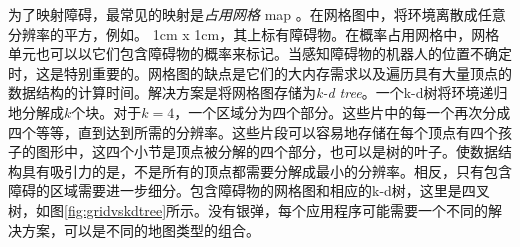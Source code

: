 
为了映射障碍，最常见的映射是\emph {占用网格} map 。在网格图中，将环境离散成任意分辨率的平方，例如。 1cm x 1cm，其上标有障碍物。在概率占用网格中，网格单元也可以以它们包含障碍物的概率来标记。当感知障碍物的机器人的位置不确定时，这是特别重要的。网格图的缺点是它们的大内存需求以及遍历具有大量顶点的数据结构的计算时间。解决方案是将网格图存储为\emph {k-d tree}。一个k-d树将环境递归地分解成$ k $个块。对于$ k = 4 $，一个区域分为四个部分。这些片中的每一个再次分成四个等等，直到达到所需的分辨率。这些片段可以容易地存储在每个顶点有四个孩子的图形中，这四个小节是顶点被分解的四个部分，也可以是树的叶子。使数据结构具有吸引力的是，不是所有的顶点都需要分解成最小的分辨率。相反，只有包含障碍的区域需要进一步细分。包含障碍物的网格图和相应的k-d树，这里是四叉树，如图\ref{fig:gridvskdtree}所示。没有银弹，每个应用程序可能需要一个不同的解决方案，可以是不同的地图类型的组合。


